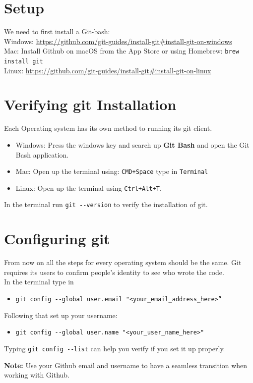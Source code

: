 \documentclass[12pt, a4paper]{article}
\begin{document}
\section{Setup}
We need to first install a Git-bash:\\
\vskip3pt
Windows: \url{https://github.com/git-guides/install-git#install-git-on-windows}\\
\vskip3pt
Mac: Install Github on macOS from the App Store or using Homebrew:
\verb+brew install git+\\
\vskip3pt
Linux: \url{https://github.com/git-guides/install-git#install-git-on-linux}
\section{Verifying git Installation}
Each Operating system has its own method to running its git client. 
\begin{itemize}
\item Windows: Press the windows key and search up \textbf{Git Bash} and open the Git Bash application.
\item Mac: Open up the terminal using: \texttt{CMD+Space} type in \texttt{Terminal}
\item Linux: Open up the terminal using \texttt{Ctrl+Alt+T}.
\end{itemize}

In the terminal run \verb+git --version+ to verify the installation of git.

\section{Configuring git}
From now on all the steps for every operating system should be the same.
Git requires its users to confirm people's identity to see who wrote the code. \\
In the terminal type in
\begin{itemize}
\item\verb+git config --global user.email "<your_email_address_here>”+
\end{itemize}
Following that set up your username:
\begin{itemize}
\item \verb+git config --global user.name "<your_user_name_here>"+
\end{itemize}

Typing \verb+git config --list+ can help you verify if you set it up properly.\\\par
\textbf{Note:} Use your Github email and username to have a seamless transition when working with Github.
\end{document}
